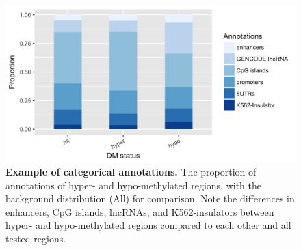 \newpage

\begin{figure}[ht!]
\centering
\includegraphics[width=1\textwidth]{chap4figs/figure4_7.png}
\caption[Example of categorical annotations.]
{
\textbf{Example of categorical annotations.} The proportion of annotations of hyper- and hypo-methylated regions, with the background distribution (All) for comparison. Note the differences in enhancers, CpG islands, lncRNAs, and K562-insulators between hyper- and hypo-methylated regions compared to each other and all tested regions.
}
\label{chap4:fig:7}
\end{figure}

\newpage

